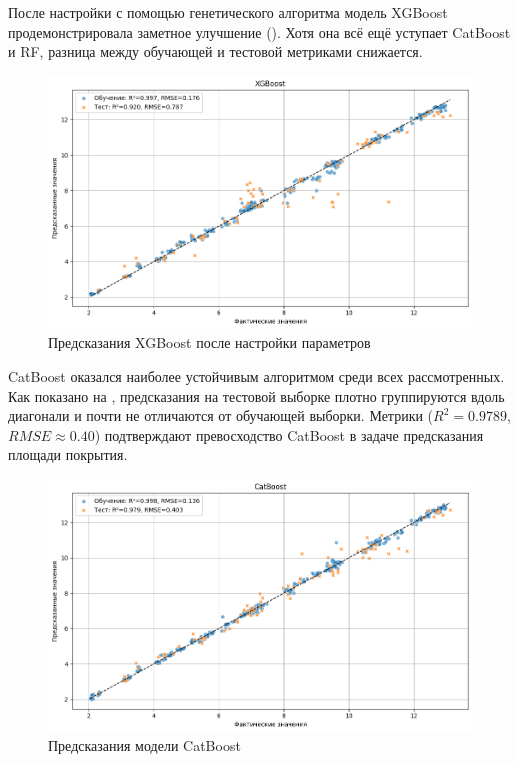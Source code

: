 После настройки с помощью генетического алгоритма модель XGBoost продемонстрировала заметное улучшение (). Хотя она всё ещё уступает CatBoost и RF, разница между обучающей и тестовой метриками снижается.

\begin{figure}[htbp!]
	\centering
	\includegraphics[width=.9\linewidth]{my_folder/images/coverage/XGBoost.png}
	\caption{Предсказания XGBoost после настройки параметров} 
	\label{fig:coverage-xgboost}  
\end{figure}


CatBoost оказался наиболее устойчивым алгоритмом среди всех рассмотренных. Как показано на , предсказания на тестовой выборке плотно группируются вдоль диагонали и почти не отличаются от обучающей выборки. Метрики ($R^2 = 0.9789$, $RMSE \approx 0.40$) подтверждают превосходство CatBoost в задаче предсказания площади покрытия.

\begin{figure}[htbp!]
	\centering
	\includegraphics[width=.9\linewidth]{my_folder/images/coverage/CatBoost.png}
	\caption{Предсказания модели CatBoost} 
	\label{fig:coverage-catboost}  
\end{figure}

